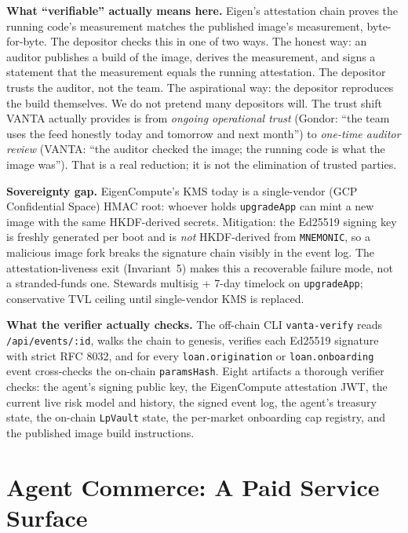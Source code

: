 \documentclass[11pt,letterpaper]{article}
\begin{document}
\textbf{What ``verifiable'' actually means here.} Eigen's attestation chain proves the running code's measurement matches the published image's measurement, byte-for-byte. The depositor checks this in one of two ways. The honest way: an auditor publishes a build of the image, derives the measurement, and signs a statement that the measurement equals the running attestation. The depositor trusts the auditor, not the team. The aspirational way: the depositor reproduces the build themselves. We do not pretend many depositors will. The trust shift VANTA actually provides is from \emph{ongoing operational trust} (Gondor: ``the team uses the feed honestly today and tomorrow and next month'') to \emph{one-time auditor review} (VANTA: ``the auditor checked the image; the running code is what the image was''). That is a real reduction; it is not the elimination of trusted parties.

\textbf{Sovereignty gap.} EigenCompute's KMS today is a single-vendor (GCP Confidential Space) HMAC root: whoever holds \texttt{upgradeApp} can mint a new image with the same HKDF-derived secrets. Mitigation: the Ed25519 signing key is freshly generated per boot and is \emph{not} HKDF-derived from \texttt{MNEMONIC}, so a malicious image fork breaks the signature chain visibly in the event log. The attestation-liveness exit (Invariant~5) makes this a recoverable failure mode, not a stranded-funds one. Stewards multisig + 7-day timelock on \texttt{upgradeApp}; conservative TVL ceiling until single-vendor KMS is replaced.

\textbf{What the verifier actually checks.} The off-chain CLI \texttt{vanta-verify} reads \texttt{/api/events/:id}, walks the chain to genesis, verifies each Ed25519 signature with strict RFC 8032, and for every \texttt{loan.origination} or \texttt{loan.onboarding} event cross-checks the on-chain \texttt{paramsHash}. Eight artifacts a thorough verifier checks: the agent's signing public key, the EigenCompute attestation JWT, the current live risk model and history, the signed event log, the agent's treasury state, the on-chain \texttt{LpVault} state, the per-market onboarding cap registry, and the published image build instructions.

\section{Agent Commerce: A Paid Service Surface}
\label{sec:commerce}
\end{document}
